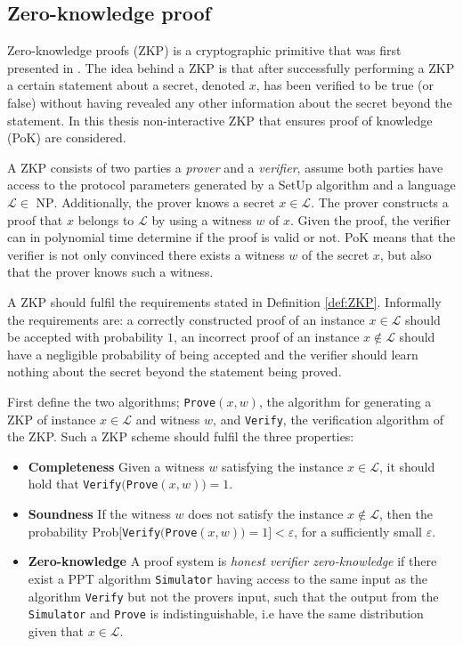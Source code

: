 \subsection*{Zero-knowledge proof}
Zero-knowledge proofs (ZKP) is a cryptographic primitive that was first presented in \cite{OG_ZKP}. The idea behind a ZKP is that after successfully performing a ZKP a certain statement about a secret, denoted $x$, has been verified to be true (or false) without having revealed any other information about the secret beyond the statement. In this thesis non-interactive ZKP that ensures proof of knowledge (PoK) are considered.  %

A ZKP consists of two parties a \textit{prover} and a \textit{verifier},  assume both parties have access to the protocol parameters generated by a SetUp algorithm and a language $\mathcal{L}\in \text{ NP}$.  Additionally, the prover knows a secret $x\in \mathcal{L}$. The prover constructs a proof that $x$ belongs to $\mathcal{L}$ by using a witness $w$ of $x$. Given the proof, the verifier can in polynomial time determine if the proof is valid or not. 
PoK means that the verifier is not only convinced there exists a witness $w$ of the secret $x$, but also that the prover knows such a witness.

A ZKP should fulfil the requirements stated in Definition \ref{def:ZKP}.  Informally the requirements are: a correctly constructed proof of an instance $x\in\mathcal{L}$ should be accepted with probability $1$, an incorrect proof of an instance $x\notin\mathcal{L}$ should have a negligible probability of being accepted and the verifier should learn nothing about the secret beyond the statement being proved.

\begin{Mydef}
\label{def:ZKP}
First define the two algorithms;  \texttt{Prove}$(x,w)$, the algorithm for generating a ZKP of instance $x\in\mathcal{L}$ and witness $w$, and  \texttt{Verify}, the verification algorithm of the ZKP. Such a ZKP scheme  should fulfil the three properties: 
\begin{itemize}
\item \textbf{Completeness} Given a witness $w$ satisfying the instance $x\in\mathcal{L}$, it should hold that \texttt{Verify}$($\texttt{Prove}$(x,w)) = 1$. 
\item \textbf{Soundness} If the witness $w$ does not satisfy the  instance $x\notin\mathcal{L}$, then the probability  Prob$[$\texttt{Verify}$($\texttt{Prove}$(x,w)) = 1] < \varepsilon$, for a sufficiently small $\varepsilon$. 
\item  \textbf{Zero-knowledge} A proof system is \textit{honest verifier zero-knowledge} if there exist a PPT algorithm \texttt{Simulator} having access to the same input as the algorithm \texttt{Verify} but not the provers input, such that the output from the \texttt{Simulator} and \texttt{Prove} is indistinguishable, i.e have the same distribution given that $x\in\mathcal{L}$.  
\end{itemize}
\end{Mydef}
 
